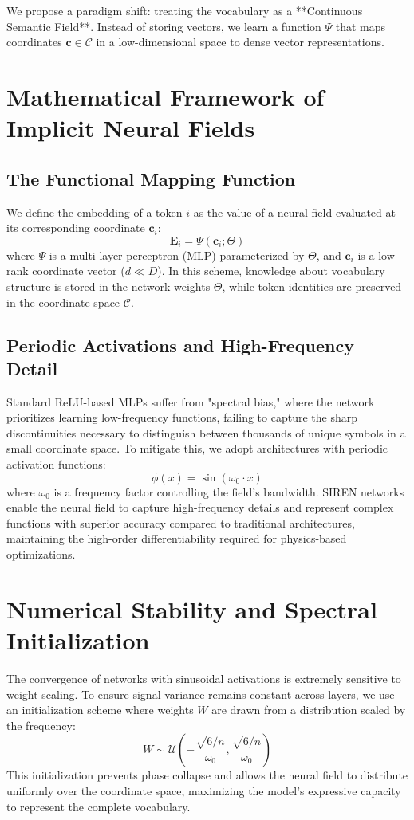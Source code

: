 \documentclass[11pt,a4paper]{report}
\begin{document}
We propose a paradigm shift: treating the vocabulary as a **Continuous Semantic Field**. Instead of storing vectors, we learn a function $\Psi$ that maps coordinates $\mathbf{c} \in \mathcal{C}$ in a low-dimensional space to dense vector representations.

\section{Mathematical Framework of Implicit Neural Fields}

\subsection{The Functional Mapping Function}
We define the embedding of a token $i$ as the value of a neural field evaluated at its corresponding coordinate $\mathbf{c}_i$:
\begin{equation}
    \mathbf{E}_i = \Psi(\mathbf{c}_i; \Theta)
\end{equation}
where $\Psi$ is a multi-layer perceptron (MLP) parameterized by $\Theta$, and $\mathbf{c}_i$ is a low-rank coordinate vector ($d \ll D$). In this scheme, knowledge about vocabulary structure is stored in the network weights $\Theta$, while token identities are preserved in the coordinate space $\mathcal{C}$.

\subsection{Periodic Activations and High-Frequency Detail}
Standard ReLU-based MLPs suffer from "spectral bias," where the network prioritizes learning low-frequency functions, failing to capture the sharp discontinuities necessary to distinguish between thousands of unique symbols in a small coordinate space. To mitigate this, we adopt architectures with periodic activation functions:
\begin{equation}
    \phi(x) = \sin(\omega_0 \cdot x)
\end{equation}
where $\omega_0$ is a frequency factor controlling the field's bandwidth. SIREN networks enable the neural field to capture high-frequency details and represent complex functions with superior accuracy compared to traditional architectures, maintaining the high-order differentiability required for physics-based optimizations.

\section{Numerical Stability and Spectral Initialization}
The convergence of networks with sinusoidal activations is extremely sensitive to weight scaling. To ensure signal variance remains constant across layers, we use an initialization scheme where weights $W$ are drawn from a distribution scaled by the frequency:
\begin{equation}
    W \sim \mathcal{U}\left(-\frac{\sqrt{6/n}}{\omega_0}, \frac{\sqrt{6/n}}{\omega_0}\right)
\end{equation}
This initialization prevents phase collapse and allows the neural field to distribute uniformly over the coordinate space, maximizing the model's expressive capacity to represent the complete vocabulary.
\end{document}
